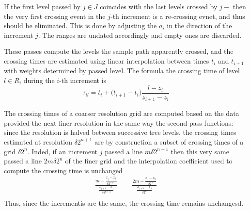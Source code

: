 If the first level passed by $j\in J$ coincides with the last levels crossed by $j-$
then the very first crossing event in the $j$-th increment is a re-crossing evnet,
and thus should be eliminated. This is done by adjusting the $a_i$ in the direction
of the increment $j$. The ranges are undated accordingly and empty ones are discarded.

These passes compute the levels the sample path apparently crossed, and the crossing
times are estimated using linear interpolation between times $t_i$ and $t_{i+1}$ with
weights determined by passed level. The formula the crossing time of level $l\in R_i$
during the $i$-th increment is
\[
\tau_{il} = t_i + \bigl(t_{i+1} - t_i\bigr) \frac{l - z_i}{z_{i+1} - z_i}
\]

The crossing times of a coarser resolution grid are computed based on the 
data provided the next finer resolution in the same way the second pass functions:
since the resolution is halved between successive tree levels, the crossing times
estimated at resolution $\delta 2^{n+1}$ are by construction a subset of crossing
times of a grid $\delta 2^n$. Inded, if an increment $j$ passed a line $m \delta 2^{n+1}$
then this very same passed a line $2m \delta 2^n$ of the finer grid and the interpolation
coefficient used to compute the crossing time is unchanged
\begin{align*}
	\frac{m - \frac{x_j - x_0}{\delta 2^{n+1}}}{ \frac{x_{j+1} - x_j}{\delta 2^{n+1}} }
	&= \frac{2m - \frac{x_j - x_0}{\delta 2^n}}{ \frac{x_{j+1} - x_j}{\delta 2^n} } \\
\end{align*}
Thus, since the incrementis are the same, the crossing time remains unchangesd.


